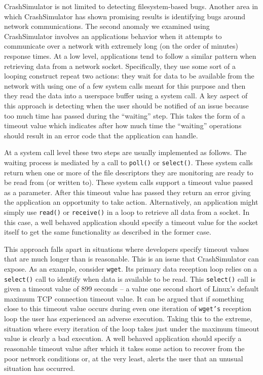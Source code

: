 CrashSimulator is not limited to detecting filesystem-based bugs.  Another area
in which CrashSimulator has shown promising results is identifying bugs around
network communications.  The second anomaly we examined using CrashSimulator
involves an applications behavior when it attempts to communicate over a network
with extremely long (on the order of minutes) response times.  At a low level,
applications tend to follow a similar pattern when retrieving data from a
network socket.  Specifically, they use some sort of a looping construct repeat
two actions: they wait for data to be available from the network with using one
of a few system calls meant for this purpose and then they read the data
into a userspace buffer using a system call.  A key aspect of this approach is
detecting when the user should be notified of an issue because too much time has
passed during the ``waiting'' step.  This takes the form of a timeout value
which indicates after how much time the ``waiting'' operations should result in
an error code that the application can handle.

At a system call level these two steps are usually implemented as follows.  The
waiting process is mediated by a call to {\tt poll()} or {\tt select()}.  These
system calls return when one or more of the file descriptors they are monitoring
are ready to be read from (or written to).  These system calls support a timeout
value passed as a parameter.  After this timeout value has passed they return an
error giving the application an opportunity to take action.  Alternatively, an
application might simply use {\tt read()} or {\tt receive()} in a loop to
retrieve all data from a socket.  In this case, a well behaved application
should specify a timeout value for the socket itself to get the same
functionality as described in the former case.

This approach falls apart in situations where developers specify timeout values
that are much longer than is reasonable.  This is an issue that CrashSimulator
can expose.  As an example, consider {\tt wget}.  Its primary data reception
loop relies on a {\tt select()} call to identify when data is available to be
read.  This {\tt select()} call is given a timeout value of 899 seconds -- a
value one second short of Linux's default maximum TCP connection timeout value.
It can be argued that if something close to this timeout value occurs during
even one iteration of {\tt wget's} reception loop the user has experienced an
adverse execution. Taking this to the extreme, situation where every iteration
of the loop takes just under the maximum timeout value is clearly a bad
execution.  A well behaved application should specify a reasonable timeout value
after which it takes some action to recover from the poor network conditions or,
at the very least, alerts the user that an unusual situation has occurred.

